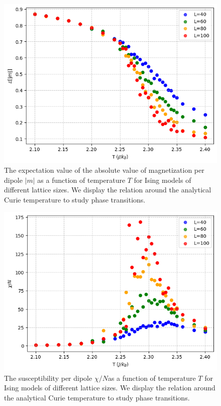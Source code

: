 \documentclass[../main_proj4_correct_template.tex]{subfiles}
\begin{document}
\begin{figure}[h!]
    \centering
    \includegraphics[width=0.8\linewidth]{Project 4/figures/p8_mabs.png}
    \caption{The expectation value of the absolute value of magnetization per dipole $|m|$ as a function of temperature $T$ for Ising models of different lattice sizes. We display the relation around the analytical Curie temperature to study phase transitions.}
    \label{fig:p8_mabs}
\end{figure}
\begin{figure}[h!]
    \centering
    \includegraphics[width=0.8\linewidth]{Project 4/figures/p8_chi.png}
    \caption{The susceptibility per dipole $\chi/N$as a function of temperature $T$ for Ising models of different lattice sizes. We display the relation around the analytical Curie temperature to study phase transitions.}
    \label{fig:p8_chi}
\end{figure}
\end{document}
